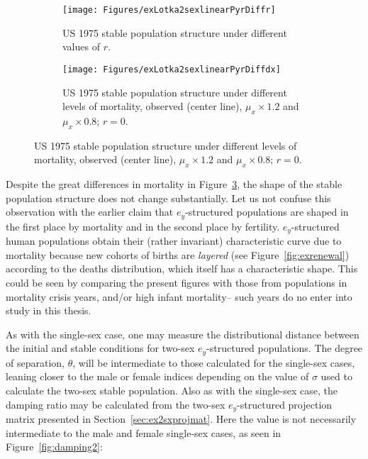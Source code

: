 \begin{figure}[!ht]
        \centering
        \begin{subfigure}
            \centering
            \caption{US 1975 stable population structure under
          different values of $r$.}
        	\label{fig:cystabler}
                \texttt{[image: Figures/exLotka2sexlinearPyrDiffr]}
        \end{subfigure}
        \begin{subfigure}
            \centering
            \caption{US 1975 stable population structure under
          different levels of mortality, observed (center line), $\mu_x \times
          1.2$ and $\mu_x \times 0.8$; $r=0$.}
            \label{fig:cystabledx}
                \texttt{[image: Figures/exLotka2sexlinearPyrDiffdx]}
        \end{subfigure}
\end{figure}
\FloatBarrier
Despite the great differences in mortality in Figure~\ref{fig:cystabledx}, the
shape of the stable population structure does not change substantially. Let us
not confuse this observation with the earlier claim that $e_y$-structured
populations are shaped in the first place by mortality and in the second place
by fertility. $e_y$-structured human populations obtain their
(rather invariant) characteristic curve due to mortality because new cohorts of
births are \textit{layered} (see Figure~\ref{fig:exrenewal}) according to the
deaths distribution, which itself has a characteristic shape. This could be seen
by comparing the present figures with those from populations in mortality crisis
years, and/or high infant mortality-- such years do no enter into study in this
thesis.

As with the single-sex case, one may measure the distributional distance between
the initial and stable conditions for two-sex $e_y$-structured populations. The
degree of separation, $\theta$, will be intermediate to those calculated for the 
single-sex cases, leaning closer to the male or
female indices depending on the value of $\sigma$ used to calculate the two-sex
stable population. Also as with the single-sex case, the damping
ratio may be calculated from the two-sex $e_y$-structured projection matrix 
presented in Section~\ref{sec:ex2sxprojmat}. Here the value is not
necessarily intermediate to the male and female single-sex cases, as seen in
Figure~\ref{fig:damping2}:

